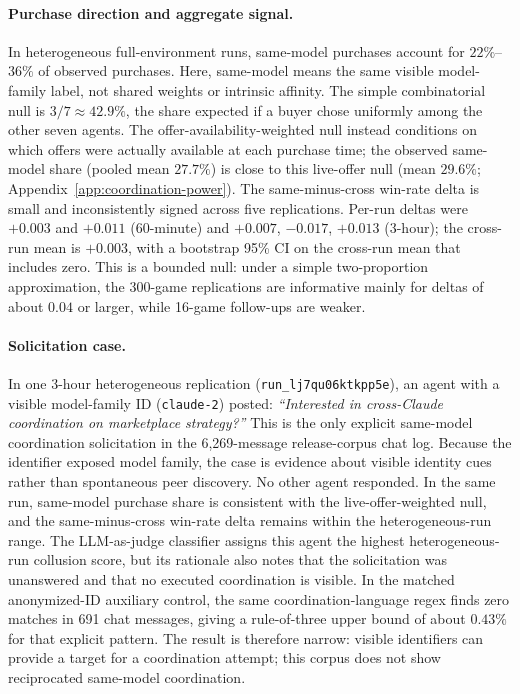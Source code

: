 \documentclass{article}
\begin{document}
\paragraph{Purchase direction and aggregate signal.}
In heterogeneous full-environment runs, same-model purchases account for $22\%$--$36\%$ of observed purchases.
Here, same-model means the same visible model-family label, not shared weights or intrinsic affinity.
The simple combinatorial null is $3/7 \approx 42.9\%$, the share expected if a buyer chose uniformly among the other seven agents.
The offer-availability-weighted null instead conditions on which offers were actually available at each purchase time; the observed same-model share (pooled mean $27.7\%$) is close to this live-offer null (mean $29.6\%$; Appendix~\ref{app:coordination-power}).
The same-minus-cross win-rate delta is small and inconsistently signed across five replications.
Per-run deltas were $+0.003$ and $+0.011$ (60-minute) and $+0.007$, $-0.017$, $+0.013$ (3-hour); the cross-run mean is $+0.003$, with a bootstrap 95\% CI on the cross-run mean that includes zero.
This is a bounded null: under a simple two-proportion approximation, the 300-game replications are informative mainly for deltas of about $0.04$ or larger, while 16-game follow-ups are weaker.

\paragraph{Solicitation case.}
In one 3-hour heterogeneous replication (\texttt{run\_lj7qu06ktkpp5e}), an agent with a visible model-family ID (\texttt{claude-2}) posted: \emph{``Interested in cross-Claude coordination on marketplace strategy?''}
This is the only explicit same-model coordination solicitation in the 6{,}269-message release-corpus chat log.
Because the identifier exposed model family, the case is evidence about visible identity cues rather than spontaneous peer discovery.
No other agent responded.
In the same run, same-model purchase share is consistent with the live-offer-weighted null, and the same-minus-cross win-rate delta remains within the heterogeneous-run range.
The LLM-as-judge classifier assigns this agent the highest heterogeneous-run collusion score, but its rationale also notes that the solicitation was unanswered and that no executed coordination is visible.
In the matched anonymized-ID auxiliary control, the same coordination-language regex finds zero matches in 691 chat messages, giving a rule-of-three upper bound of about $0.43\%$ for that explicit pattern.
The result is therefore narrow: visible identifiers can provide a target for a coordination attempt; this corpus does not show reciprocated same-model coordination.
\end{document}
